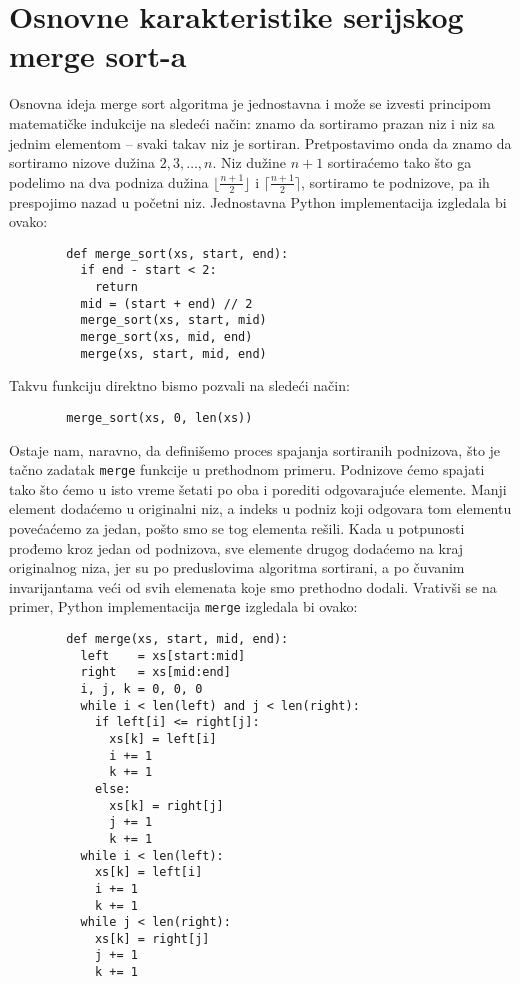 \documentclass[a4paper,11pt]{article}
\begin{document}
    \newpage

    \section{Osnovne karakteristike serijskog merge sort-a}

    Osnovna ideja merge sort algoritma je jednostavna i može se izvesti principom
    matematičke indukcije na sledeći način: znamo da sortiramo prazan niz i niz sa jednim elementom --
    svaki takav niz je sortiran. Pretpostavimo onda da znamo da sortiramo nizove dužina
    $2,3, \dots, n$. Niz dužine $n + 1$ sortiraćemo tako što ga podelimo na dva podniza
    dužina $\lfloor \frac{n + 1}{2} \rfloor$ i $\lceil \frac{n + 1}{2} \rceil$, sortiramo
    te podnizove, pa ih prespojimo nazad u početni niz. Jednostavna Python implementacija
    izgledala bi ovako:
    \begin{verbatim}
        def merge_sort(xs, start, end):
          if end - start < 2:
            return
          mid = (start + end) // 2
          merge_sort(xs, start, mid)
          merge_sort(xs, mid, end)
          merge(xs, start, mid, end)
    \end{verbatim}
    Takvu funkciju direktno bismo pozvali na sledeći način:
    \begin{verbatim}
        merge_sort(xs, 0, len(xs))
    \end{verbatim}
    Ostaje nam, naravno, da definišemo proces spajanja sortiranih podnizova, što je tačno
    zadatak \verb|merge| funkcije u prethodnom primeru. Podnizove ćemo spajati tako
    što ćemo u isto vreme šetati po oba i porediti odgovarajuće elemente. Manji element
    dodaćemo u originalni niz, a indeks u podniz koji odgovara tom elementu povećaćemo za jedan,
    pošto smo se tog elementa rešili. Kada u potpunosti prođemo kroz jedan od podnizova, sve elemente
    drugog dodaćemo na kraj originalnog niza, jer su po preduslovima algoritma sortirani, a po
    čuvanim invarijantama veći od svih elemenata koje smo prethodno dodali. Vrativši se na
    primer, Python implementacija \verb|merge| izgledala bi ovako:
    \begin{verbatim}
        def merge(xs, start, mid, end):
          left    = xs[start:mid]
          right   = xs[mid:end]
          i, j, k = 0, 0, 0
          while i < len(left) and j < len(right):
            if left[i] <= right[j]:
              xs[k] = left[i]
              i += 1
              k += 1
            else:
              xs[k] = right[j]
              j += 1
              k += 1
          while i < len(left):
            xs[k] = left[i]
            i += 1
            k += 1
          while j < len(right):
            xs[k] = right[j]
            j += 1
            k += 1
    \end{verbatim}
\end{document}
